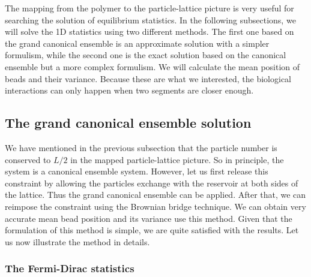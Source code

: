 The mapping from the polymer to the particle-lattice picture is very useful for searching the solution of equilibrium statistics. In the following subsections, we will solve the 1D statistics using two different methods. The first one based on the grand canonical ensemble is an approximate solution with a simpler formulism, while the second one is the exact solution based on the canonical ensemble but a more complex formulism. We will calculate the mean position of beads and their variance. Because these are what we interested, the biological interactions can only happen when two segments are closer enough. 

\subsection{The grand canonical ensemble solution}
\label{sub:the_grand_canonical_ensemble_solution}
We have mentioned in the previous subsection that the particle number is conserved to $L/2$ in the mapped particle-lattice picture. So in principle, the system is a canonical ensemble system. However, let us first release this constraint by allowing the particles exchange with the reservoir at both sides of the lattice. Thus the grand canonical ensemble can be applied. After that, we can reimpose the constraint using the Brownian bridge technique. We can obtain very accurate mean bead position and its variance use this method. Given that the formulation of this method is simple, we are quite satisfied with the results. Let us now illustrate the method in details.

\subsubsection{The Fermi-Dirac statistics}
\label{ssub:The Fermi-Dirac Statistics}

